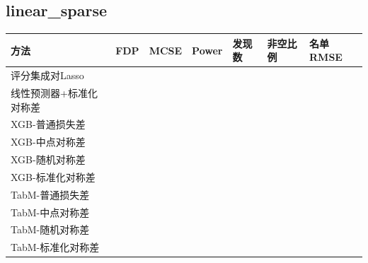 \documentclass[UTF8,11pt,a4paper]{ctexart}
\begin{document}
\subsection{linear\_sparse}\label{linear_sparse}

{\def\LTcaptype{none} %
{
\footnotesize
\begin{longtable}[]{@{}
  >{\raggedright\arraybackslash}p{}
  >{\raggedright\arraybackslash}p{}
  >{\raggedright\arraybackslash}p{}
  >{\raggedright\arraybackslash}p{}
  >{\raggedright\arraybackslash}p{}
  >{\raggedright\arraybackslash}p{}
  >{\raggedright\arraybackslash}p{}@{}}
\toprule\noalign{}
\begin{minipage}[b]{\linewidth}\raggedright
方法
\end{minipage} & \begin{minipage}[b]{\linewidth}\raggedright
FDP
\end{minipage} & \begin{minipage}[b]{\linewidth}\raggedright
MCSE
\end{minipage} & \begin{minipage}[b]{\linewidth}\raggedright
Power
\end{minipage} & \begin{minipage}[b]{\linewidth}\raggedright
发现数
\end{minipage} & \begin{minipage}[b]{\linewidth}\raggedright
非空比例
\end{minipage} & \begin{minipage}[b]{\linewidth}\raggedright
名单RMSE
\end{minipage} \\
\midrule\noalign{}
\endhead
\bottomrule\noalign{}
\endlastfoot
评分集成对Lasso & 0.1639 & 0.0213 & 1.0000 & 6.65 & 1.00 & 0.7438 \\
线性预测器+标准化对称差 & 0.1798 & 0.0182 & 1.0000 & 6.50 & 1.00 & 0.7438 \\
XGB-普通损失差 & 0.1845 & 0.0203 & 1.0000 & 6.72 & 1.00 & 0.7446 \\
XGB-中点对称差 & 0.1632 & 0.0196 & 1.0000 & 6.51 & 1.00 & 0.7442 \\
XGB-随机对称差 & 0.1865 & 0.0215 & 1.0000 & 6.80 & 1.00 & 0.7452 \\
XGB-标准化对称差 & 0.1903 & 0.0202 & 0.9980 & 6.78 & 1.00 & 0.7449 \\
TabM-普通损失差 & 0.2334 & 0.0229 & 1.0000 & 7.40 & 1.00 & 0.7450 \\
TabM-中点对称差 & 0.2013 & 0.0213 & 1.0000 & 6.94 & 1.00 & 0.7442 \\
TabM-随机对称差 & 0.1850 & 0.0219 & 1.0000 & 6.86 & 1.00 & 0.7447 \\
TabM-标准化对称差 & 0.1955 & 0.0205 & 0.9700 & 6.73 & 0.97 & 0.7584 \\
\end{longtable}
}
}
\end{document}
